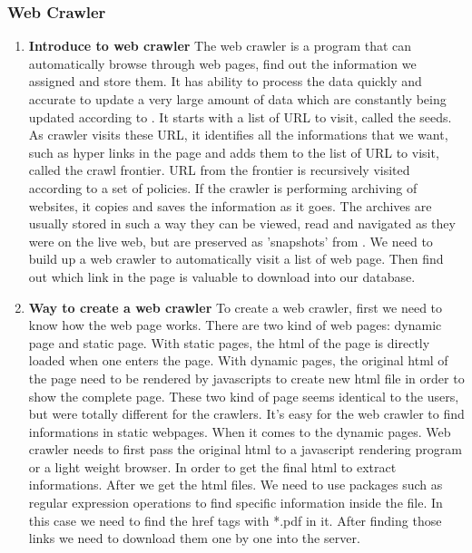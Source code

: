 \subsubsection{Web Crawler}
\begin{enumerate}
	
	\item\textbf{Introduce to web crawler}
	\setlength{\parindent}{1em}	
	The web crawler is a program that can automatically browse through web pages, find out the information we assigned and store them.
	It has ability to process the data quickly and accurate to update a very large amount of data which are constantly being updated according to \cite{Liu2012}.
	It starts with a list of URL to visit, called the seeds.
	As crawler visits these URL, it identifies all the informations that we want, such as hyper links in the page and adds them to the list of URL to visit, called the crawl frontier.
	URL from the frontier is recursively visited according to a set of policies.
	If the crawler is performing archiving of websites, it copies and saves the information as it goes.
	The archives are usually stored in such a way they can be viewed, read and navigated as they were on the live web, but are preserved as 'snapshots' from \cite{Du2013}.
	We need to build up a web crawler to automatically visit a list of web page.
	Then find out which link in the page is valuable to download into our database.
	
	\item\textbf{Way to create a web crawler}
	\setlength{\parindent}{1em}	
	To create a web crawler, first we need to know how the web page works. 
	There are two kind of web pages: dynamic page and static page.
	With static pages, the html of the page is directly loaded when one enters the page.
	With dynamic pages, the original html of the page need to be rendered by javascripts to create new html file in order to show the complete page.
	These two kind of page seems identical to the users, but were totally different for the crawlers.
	It's easy for the web crawler to find informations in static webpages.
	When it comes to the dynamic pages. 
	Web crawler needs to first pass the original html to a javascript rendering program or a light weight browser. 
	In order to get the final html to extract informations.
	After we get the html files.
	We need to use packages such as regular expression operations to find specific information inside the file.
	In this case we need to find the href tags with *.pdf in it.
	After finding those links we need to download them one by one into the server.	
	
\end{enumerate}

